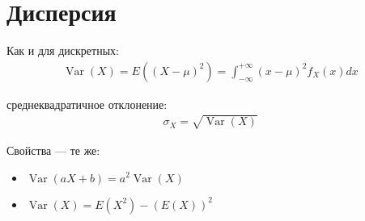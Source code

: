 \documentclass[12pt]{article}
\DeclareMathOperator{\Var}{Var}
\begin{document}
  \section{Дисперсия}

  Как и для дискретных:
  \begin{align*}
      \Var(X) = E((X - \mu)^2) = \int_{-\infty}^{+\infty} (x - \mu)^2 f_X(x) dx
  \end{align*}

  среднеквадратичное отклонение:
  \begin{align*}
      \sigma_X = \sqrt{\Var(X)}
  \end{align*}

  Свойства --- те же:
  \begin{itemize}
      \item $\Var(aX + b) = a^2\Var(X)$
      \item $\Var(X) = E(X^2) - (E(X))^2$
  \end{itemize}
\end{document}
